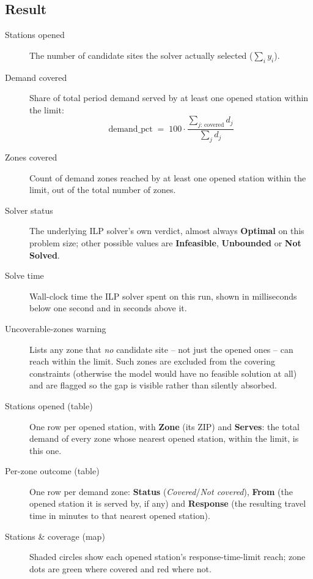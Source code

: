 \documentclass[11pt]{article}
\begin{document}
\subsection{Result}
\begin{description}
  \item[Stations opened] The number of candidate sites the solver actually
    selected ($\sum_i y_i$).
  \item[Demand covered] Share of total period demand served by at least one
    opened station within the limit:
    \[
      \text{demand\_pct} \;=\; 100\cdot\frac{\sum_{j:\,\text{covered}} d_j}{\sum_j d_j}
    \]
  \item[Zones covered] Count of demand zones reached by at least one opened
    station within the limit, out of the total number of zones.
  \item[Solver status] The underlying ILP solver's own verdict, almost always
    \textbf{Optimal} on this problem size; other possible values are
    \textbf{Infeasible}, \textbf{Unbounded} or \textbf{Not Solved}.
  \item[Solve time] Wall-clock time the ILP solver spent on this run, shown in
    milliseconds below one second and in seconds above it.
  \item[Uncoverable-zones warning] Lists any zone that \emph{no} candidate
    site -- not just the opened ones -- can reach within the limit. Such zones
    are excluded from the covering constraints (otherwise the model would
    have no feasible solution at all) and are flagged so the gap is visible
    rather than silently absorbed.
  \item[Stations opened (table)] One row per opened station, with
    \textbf{Zone} (its ZIP) and \textbf{Serves}: the total demand of every
    zone whose nearest opened station, within the limit, is this one.
  \item[Per-zone outcome (table)] One row per demand zone: \textbf{Status}
    (\emph{Covered}/\emph{Not covered}), \textbf{From} (the opened station it
    is served by, if any) and \textbf{Response} (the resulting travel time in
    minutes to that nearest opened station).
  \item[Stations \& coverage (map)] Shaded circles show each opened station's
    response-time-limit reach; zone dots are green where covered and red
    where not.
\end{description}
\end{document}
